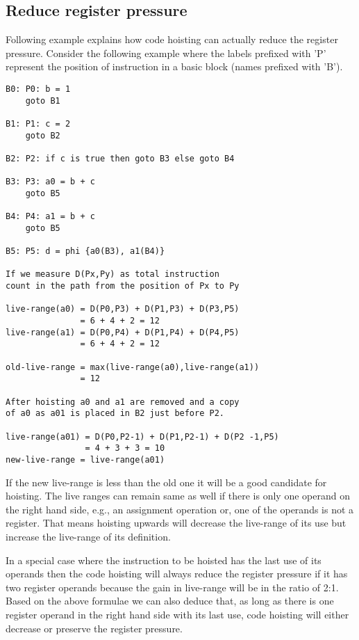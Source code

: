 \documentclass{sig-alternate}
\begin{document}
\subsection{Reduce register pressure}
\label{hoist:reg-pressure}
Following example explains how code hoisting can actually reduce the register
pressure.  Consider the following example where the labels prefixed with 'P'
represent the position of instruction in a basic block (names prefixed with 'B').

\begin{verbatim}
B0: P0: b = 1
    goto B1

B1: P1: c = 2
    goto B2

B2: P2: if c is true then goto B3 else goto B4

B3: P3: a0 = b + c
    goto B5

B4: P4: a1 = b + c
    goto B5

B5: P5: d = phi {a0(B3), a1(B4)}

If we measure D(Px,Py) as total instruction
count in the path from the position of Px to Py

live-range(a0) = D(P0,P3) + D(P1,P3) + D(P3,P5)
               = 6 + 4 + 2 = 12
live-range(a1) = D(P0,P4) + D(P1,P4) + D(P4,P5)
               = 6 + 4 + 2 = 12

old-live-range = max(live-range(a0),live-range(a1))
               = 12

After hoisting a0 and a1 are removed and a copy
of a0 as a01 is placed in B2 just before P2.

live-range(a01) = D(P0,P2-1) + D(P1,P2-1) + D(P2 -1,P5)
                = 4 + 3 + 3 = 10
new-live-range = live-range(a01)
\end{verbatim}

If the new live-range is less than the old one it will be a good candidate for
hoisting. The live ranges can remain same as well if there is only one operand
on the right hand side, e.g., an assignment operation or, one of the operands is
not a register. That means hoisting upwards will decrease the live-range of its
use but increase the live-range of its definition.

In a special case where the instruction to be hoisted has the last use of its
operands then the code hoisting will always reduce the register pressure if it
has two register operands because the gain in live-range will be in the ratio of
2:1. Based on the above formulae we can also deduce that, as long as there is
one register operand in the right hand side with its last use, code hoisting
will either decrease or preserve the register pressure.
\end{document}
